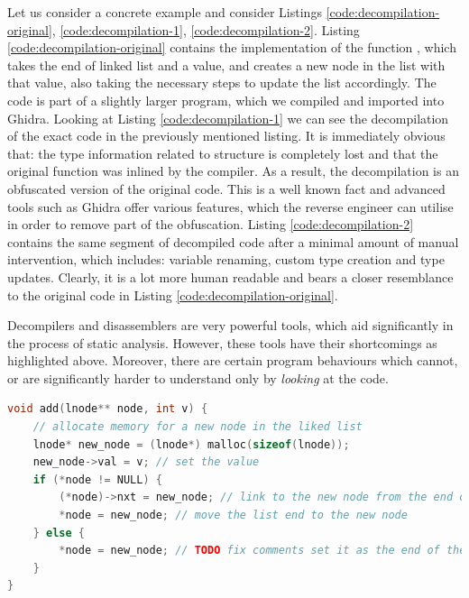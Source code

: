 Let us consider a concrete example and consider Listings \ref{code:decompilation-original}, \ref{code:decompilation-1}, \ref{code:decompilation-2}. Listing \ref{code:decompilation-original} contains the implementation of the function , which takes the end of linked list and a value, and creates a new node in the list with that value, also taking the necessary steps to update the list accordingly. The code is part of a slightly larger  program, which we compiled and imported into Ghidra. Looking at Listing \ref{code:decompilation-1} we can see the decompilation of the exact code in the previously mentioned listing. It is immediately obvious that: the type information related to  structure is completely lost and that the original function was inlined by the compiler. As a result, the decompilation is an obfuscated version of the original code. This is a well known fact and advanced tools such as Ghidra offer various features, which the reverse engineer can utilise in order to remove part of the obfuscation. Listing \ref{code:decompilation-2} contains the same segment of decompiled code after a minimal amount of manual intervention, which includes: variable renaming, custom type creation and type updates. Clearly, it is a lot more human readable and bears a closer resemblance to the original code in Listing \ref{code:decompilation-original}. 

Decompilers and disassemblers are very powerful tools, which aid significantly in the process of static analysis. However, these tools have their shortcomings as highlighted above. Moreover, there are certain program behaviours which cannot, or are significantly harder to understand only by \emph{looking} at the code.



\begin{lstlisting}[language=c, label={code:decompilation-original}, caption={TODO}]
void add(lnode** node, int v) {
    // allocate memory for a new node in the liked list
    lnode* new_node = (lnode*) malloc(sizeof(lnode));
    new_node->val = v; // set the value
    if (*node != NULL) {
        (*node)->nxt = new_node; // link to the new node from the end of the list
        *node = new_node; // move the list end to the new node
    } else {
        *node = new_node; // TODO fix comments set it as the end of the list, it it is the first one
    }
}
\end{lstlisting}

